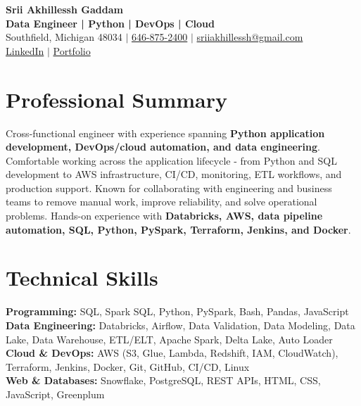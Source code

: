 \documentclass[letterpaper,10pt]{article}
\begin{document}
\fontsize{9.35pt}{10.45pt}\selectfont

\begin{center}
    {\LARGE \textbf{Srii Akhillessh Gaddam}} \\[-1pt]
    \textbf{Data Engineer | Python | DevOps | Cloud} \\[2pt]
    Southfield, Michigan 48034 $|$
    \href{tel:6468752400}{646-875-2400} $|$
    \href{mailto:sriiakhillessh@gmail.com}{sriiakhillessh@gmail.com} \\[1pt]
    \href{https://www.linkedin.com/in/srii-akhiilessh-gaddam-b48668191/}{LinkedIn} $|$
    \href{https://sriiakhillesshg.github.io/portfolio/}{Portfolio}
\end{center}
\vspace{-8pt}

\section{Professional Summary}
\small{Cross-functional engineer with experience spanning \textbf{Python application development, DevOps/cloud automation, and data engineering}. Comfortable working across the application lifecycle - from Python and SQL development to AWS infrastructure, CI/CD, monitoring, ETL workflows, and production support. Known for collaborating with engineering and business teams to remove manual work, improve reliability, and solve operational problems. Hands-on experience with \textbf{Databricks, AWS, data pipeline automation, SQL, Python, PySpark, Terraform, Jenkins, and Docker}.}

\section{Technical Skills}
\small{
\textbf{Programming:} SQL, Spark SQL, Python, PySpark, Bash, Pandas, JavaScript \\
\textbf{Data Engineering:} Databricks, Airflow, Data Validation, Data Modeling, Data Lake, Data Warehouse, ETL/ELT, Apache Spark, Delta Lake, Auto Loader \\
\textbf{Cloud \& DevOps:} AWS (S3, Glue, Lambda, Redshift, IAM, CloudWatch), Terraform, Jenkins, Docker, Git, GitHub, CI/CD, Linux \\
\textbf{Web \& Databases:} Snowflake, PostgreSQL, REST APIs, HTML, CSS, JavaScript, Greenplum
}
\end{document}
